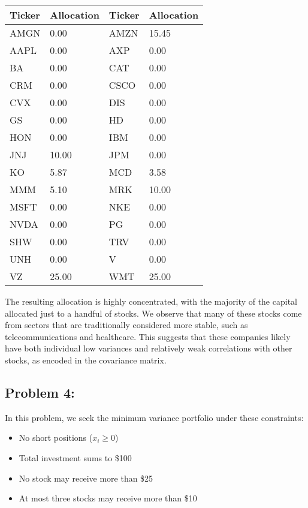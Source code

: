 \documentclass{report}
\begin{document}
\begin{center}
\begin{tabular}{ll|ll}
\toprule
\textbf{Ticker} & \textbf{Allocation} & \textbf{Ticker} & \textbf{Allocation} \\
\midrule
AMGN & 0.00 & AMZN & 15.45 \\
AAPL & 0.00 & AXP  & 0.00 \\
BA   & 0.00 & CAT  & 0.00 \\
CRM  & 0.00 & CSCO & 0.00 \\
CVX  & 0.00 & DIS  & 0.00 \\
GS   & 0.00 & HD   & 0.00 \\
HON  & 0.00 & IBM  & 0.00 \\
JNJ  & 10.00 & JPM  & 0.00 \\
KO   & 5.87 & MCD  & 3.58 \\
MMM  & 5.10 & MRK  & 10.00 \\
MSFT & 0.00 & NKE  & 0.00 \\
NVDA & 0.00 & PG   & 0.00 \\
SHW  & 0.00 & TRV  & 0.00 \\
UNH  & 0.00 & V    & 0.00 \\
VZ   & 25.00 & WMT  & 25.00 \\
\bottomrule
\end{tabular}
\end{center}

The resulting allocation is highly concentrated, with the majority of the capital allocated just to a handful of stocks. We observe that many of these stocks come from sectors that are traditionally considered more stable, such as telecommunications and healthcare. This suggests that these companies likely have both individual low variances and relatively weak correlations with other stocks, as encoded in the covariance matrix.

\pagebreak



\subsection*{Problem 4:}
In this problem, we seek the minimum variance portfolio under these constraints:
\begin{itemize}
    \item No short positions ($x_i \geq 0$)
    \item Total investment sums to \$100
    \item No stock may receive more than \$25
    \item At most three stocks may receive more than \$10
\end{itemize}
\end{document}
